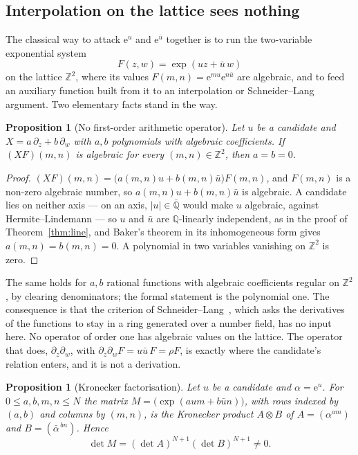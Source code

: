 \documentclass[11pt,a4paper]{article}
\theoremstyle{plain}
\newtheorem{proposition}[theorem]{Proposition}
\theoremstyle{definition}
\newcommand{\e}{\mathrm{e}}
\newcommand{\Q}{\mathbb{Q}}
\newcommand{\Z}{\mathbb{Z}}
\newcommand{\Alg}{\overline{\mathbb{Q}}}
\begin{document}
\subsection*{Interpolation on the lattice sees nothing}

The classical way to attack $\e^{u}$ and $\e^{\bar u}$ together is to run the two-variable
exponential system
\[
  F(z,w)=\exp(uz+\bar u\,w)
\]
on the lattice $\Z^{2}$, where its values $F(m,n)=\e^{mu}\e^{n\bar u}$ are algebraic, and to feed
an auxiliary function built from it to an interpolation or Schneider--Lang argument. Two
elementary facts stand in the way.

\begin{proposition}[No first-order arithmetic operator]\label{prop:no-deriv}
Let $u$ be a candidate and $X=a\,\partial_{z}+b\,\partial_{w}$ with $a,b$ polynomials with
algebraic coefficients. If $(XF)(m,n)$ is algebraic for every $(m,n)\in\Z^{2}$, then $a=b=0$.
\end{proposition}

\begin{proof}
$(XF)(m,n)=\bigl(a(m,n)u+b(m,n)\bar u\bigr)F(m,n)$, and $F(m,n)$ is a non-zero algebraic
number, so $a(m,n)u+b(m,n)\bar u$ is algebraic. A candidate lies on neither axis --- on an axis,
$|u|\in\Alg$ would make $u$ algebraic, against Hermite--Lindemann --- so $u$ and $\bar u$ are
$\Q$-linearly independent, as in the proof of Theorem~\ref{thm:line}, and Baker's theorem in its
inhomogeneous form gives $a(m,n)=b(m,n)=0$. A polynomial in two variables vanishing on $\Z^{2}$
is zero.
\end{proof}

The same holds for $a,b$ rational functions with algebraic coefficients regular on $\Z^{2}$, by
clearing denominators; the formal statement is the polynomial one. The consequence is that the
criterion of Schneider--Lang~\cite[Theorem~4.1]{waldschmidt-book}, which asks the derivatives of
the functions to stay in a ring generated over a number field, has no input here. No operator of
order one has algebraic values on the lattice. The operator that does, $\partial_{z}\partial_{w}$,
with $\partial_{z}\partial_{w}F=u\bar u\,F=\rho F$, is exactly where the candidate's relation
enters, and it is not a derivation.

\begin{proposition}[Kronecker factorisation]\label{prop:kronecker}
Let $u$ be a candidate and $\alpha=\e^{u}$. For $0\le a,b,m,n\le N$ the matrix
$M=\bigl(\exp(aum+b\bar u n)\bigr)$, with rows indexed by $(a,b)$ and columns by $(m,n)$, is the
Kronecker product $A\otimes B$ of $A=(\alpha^{am})$ and $B=(\bar\alpha^{\,bn})$. Hence
\[
  \det M=(\det A)^{N+1}(\det B)^{N+1}\neq0 .
\]
\end{proposition}
\end{document}
